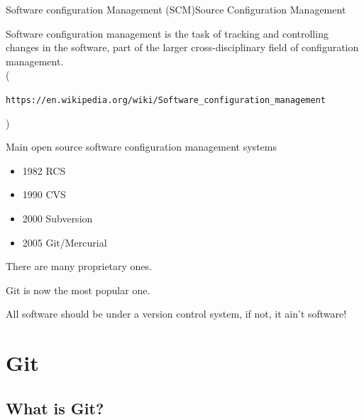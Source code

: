 \documentclass{beamer}
\begin{document}

\begin{frame}[plain]{Software configuration Management (SCM)}{Source Configuration Management}


Software configuration management is the task of tracking and controlling changes in the software, part of the larger cross-disciplinary field of configuration management.\\
(\begin{scriptsize}\texttt{https://en.wikipedia.org/wiki/Software\_configuration\_management}                                                                                         \end{scriptsize})

Main open source software configuration management systems
\begin{itemize}
 \item 1982 RCS
 \item 1990 CVS
 \item 2000 Subversion
 \item 2005 Git/Mercurial
\end{itemize}

There are many proprietary ones. 

Git is now the most popular one.

All software should be under a version control system, if not, it ain't software!

\end{frame}

\section{Git}
\subsection{What is Git?}
\end{document}

